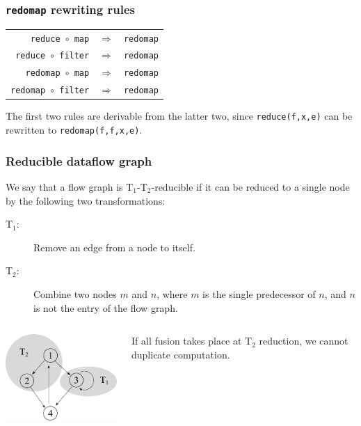 \documentclass{beamer}
\begin{document}
\begin{frame}
  \frametitle{\texttt{redomap} rewriting rules}

  \begin{center}
    \begin{tabular}{rcl}
      \texttt{reduce $\circ$ map}    & $\Rightarrow$ & \texttt{redomap} \\
      \texttt{reduce $\circ$ filter}    & $\Rightarrow$ & \texttt{redomap} \\
      \texttt{redomap $\circ$ map}    & $\Rightarrow$ & \texttt{redomap} \\
      \texttt{redomap $\circ$ filter}    & $\Rightarrow$ & \texttt{redomap} \\
    \end{tabular}
  \end{center}

  The first two rules are derivable from the latter two, since
  \texttt{reduce(f,x,e)} can be rewritten to \texttt{redomap(f,f,x,e)}.

\end{frame}

\begin{frame}
  \frametitle{Reducible dataflow graph}

  We say that a flow graph is T$_{1}$-T$_{2}$-reducible if it can be
  reduced to a single node by the following two transformations:

  \begin{description}
  \item[T$_{1}$:] Remove an edge from a node to itself.

  \item[T$_{2}$:] Combine two nodes $m$ and $n$, where $m$ is the
    single predecessor of $n$, and $n$ is not the entry of the flow
    graph.
  \end{description}

  \begin{columns}
    \begin{column}{6cm}
      \includegraphics[width=6cm]{img/t1t2.pdf}\hfill
    \end{column}
    \begin{column}{4cm}
      If all fusion takes place at T$_{2}$ reduction, we cannot
      duplicate computation.
    \end{column}
  \end{columns}

\end{frame}
\end{document}
